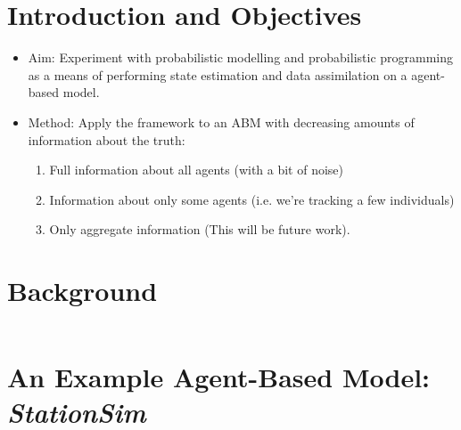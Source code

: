 \documentclass[runningheads]{llncs}
\begin{document}
\section{Introduction and Objectives}




\begin{itemize}
\item Aim: Experiment with probabilistic modelling and probabilistic programming as a means of performing state estimation and data assimilation on a agent-based model.
\item Method: Apply the framework to an ABM with decreasing amounts of information about the truth:
	\begin{enumerate}
	\item Full information about all agents (with a bit of noise)
	\item Information about only some agents (i.e. we're tracking a few individuals)
	\item Only aggregate information (This will be future work).
	\end{enumerate}
\end{itemize}


%
%
%
%
\section{Background}

$ $ %






\section{An Example Agent-Based Model: \textit{StationSim}}
\end{document}
